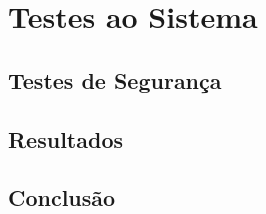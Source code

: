 \chapter{Testes ao Sistema}
\label{chap:testes}

\section{Testes de Segurança}
\label{sec:seguranca}

\section{Resultados}
\label{sec:resultados}

\section{Conclusão}
\label{sec:conclusTestes}